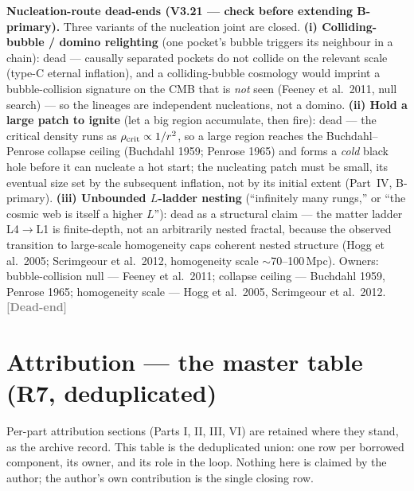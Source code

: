 \documentclass[11pt]{article}
\newcommand{\dead}{\textcolor{gray}{\textbf{[Dead-end]}}}
\begin{document}
\medskip\noindent\textbf{Nucleation-route dead-ends (V3.21 --- check before extending B-primary).} Three variants of the nucleation joint are closed. \textbf{(i) Colliding-bubble / domino relighting} (one pocket's bubble triggers its neighbour in a chain): dead --- causally separated pockets do not collide on the relevant scale (type-C eternal inflation), and a colliding-bubble cosmology would imprint a bubble-collision signature on the CMB that is \emph{not} seen (Feeney et al.\ 2011, null search) --- so the lineages are independent nucleations, not a domino. \textbf{(ii) Hold a large patch to ignite} (let a big region accumulate, then fire): dead --- the critical density runs as $\rho_{\rm crit}\propto1/r^2$, so a large region reaches the Buchdahl--Penrose collapse ceiling (Buchdahl 1959; Penrose 1965) and forms a \emph{cold} black hole before it can nucleate a hot start; the nucleating patch must be small, its eventual size set by the subsequent inflation, not by its initial extent (Part~IV, B-primary). \textbf{(iii) Unbounded $L$-ladder nesting} (``infinitely many rungs,'' or ``the cosmic web is itself a higher $L$''): dead as a structural claim --- the matter ladder L4$\to$L1 is finite-depth, not an arbitrarily nested fractal, because the observed transition to large-scale homogeneity caps coherent nested structure (Hogg et al.\ 2005; Scrimgeour et al.\ 2012, homogeneity scale $\sim$70--100\,Mpc). Owners: bubble-collision null --- Feeney et al.\ 2011; collapse ceiling --- Buchdahl 1959, Penrose 1965; homogeneity scale --- Hogg et al.\ 2005, Scrimgeour et al.\ 2012. \dead\quad

\clearpage

\part{Attribution --- the master table (R7, deduplicated)}
\setcounter{section}{0}\setcounter{equation}{0}\setcounter{figure}{0}

\noindent Per-part attribution sections (Parts I, II, III, VI) are retained where they stand, as the archive record. This table is the deduplicated union: one row per borrowed component, its owner, and its role in the loop. Nothing here is claimed by the author; the author's own contribution is the single closing row.
\end{document}
